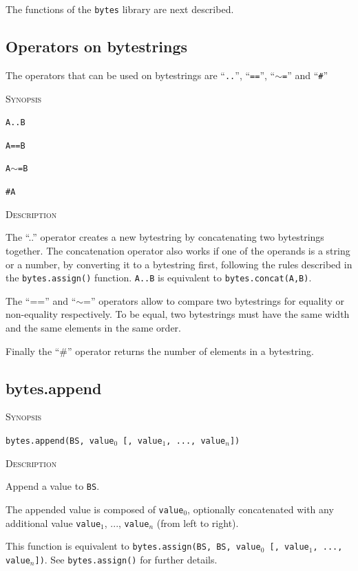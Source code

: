 \documentclass[11pt]{report}
\newcommand{\mansection}[1]{\vspace{0.5em}\par\noindent\textsc{#1}\vspace{0.5em}\par}
\newcommand{\syn}[1]{\texttt{#1}}
\begin{document}
The functions of the \syn{bytes} library are next described.

\subsection{Operators on bytestrings}
  
The operators that can be used on bytestrings are ``\syn{..}'', ``\syn{==}'', ``\syn{$\sim$=}'' and ``\syn{\#}''

\mansection{Synopsis}

\syn{A..B} 

\syn{A==B}

\syn{A$\sim$=B}

\syn{\#A}

\mansection{Description}
  
The ``..'' operator creates a new bytestring by concatenating two bytestrings together.
The concatenation operator also works if one of the operands is a string or a number, 
by converting it to a bytestring first, following the rules described in the 
\syn{bytes.assign()} function. 
\syn{A..B} is equivalent to \syn{bytes.concat(A,B)}.
  
The ``=='' and ``$\sim$='' operators allow to compare two bytestrings for equality or
non-equality respectively. To be equal, two bytestrings must have the same width
and the same elements in the same order.
 
Finally the ``\#'' operator returns the number of elements in a bytestring.

\subsection{bytes.append}

\mansection{Synopsis}

\syn{bytes.append(BS, value$_0$ [, value$_1$, ..., value$_n$])}

\mansection{Description}

Append a value to \syn{BS}.

The appended value is composed of \syn{value$_0$}, optionally concatenated with
any additional value \syn{value$_1$}, ..., \syn{value$_n$} (from left to right).

This function is equivalent to 
\syn{bytes.assign(BS, BS, \syn{value$_0$} [, \syn{value$_1$}, ..., \syn{value$_n$}])}.
See \syn{bytes.assign()} for further details.
\end{document}
